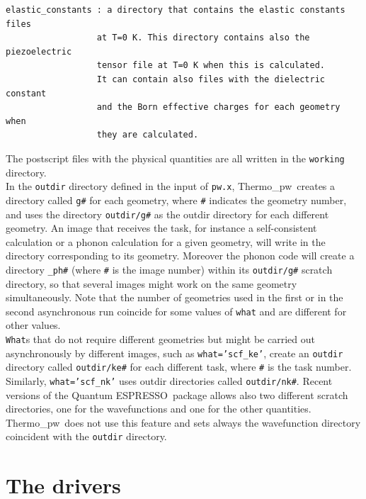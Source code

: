 \documentclass[12pt,a4paper,twoside]{report}
\def\qe{{\sc Quantum ESPRESSO}}
\def\tpw{{\sc Thermo}\_{\sc pw}}
\begin{document}
\begin{footnotesize}
\begin{verbatim}
elastic_constants : a directory that contains the elastic constants files
                  at T=0 K. This directory contains also the piezoelectric
                  tensor file at T=0 K when this is calculated.
                  It can contain also files with the dielectric constant
                  and the Born effective charges for each geometry when 
                  they are calculated.
\end{verbatim}
\end{footnotesize}
The postscript files with the physical quantities are all written in
the \texttt{working} directory. \\
In the \texttt{outdir} directory defined in the input of \texttt{pw.x},
\tpw\ creates a directory called \texttt{g\#} for each geometry, 
where \texttt{\#} indicates the geometry number, and uses the directory 
\texttt{outdir/g\#} as the outdir directory for each different geometry. 
An image that receives the task, for instance a self-consistent calculation 
or a phonon calculation for a given geometry, will write in the directory 
corresponding to its geometry.
Moreover the phonon code will create a directory \texttt{\_ph\#} 
(where \texttt{\#} is the image number) within its \texttt{outdir/g\#} scratch 
directory, so that several images might work on the same geometry 
simultaneously.
Note that the number of geometries used in the first or in the second
asynchronous run coincide for some values of \texttt{what} and are
different for other values. \\
\texttt{What}s that do not require different geometries but might be carried
out asynchronously by different images, such as \texttt{what='scf\_ke'}, 
create an \texttt{outdir} directory called
\texttt{outdir/ke\#} for each different task, where \texttt{\#} is the
task number. Similarly, \texttt{what='scf\_nk'} uses outdir directories
called \texttt{outdir/nk\#}.
Recent versions of the \qe\ package allows also two different scratch
directories, one for the wavefunctions and one for the other quantities.
\tpw\ does not use this feature and sets always the wavefunction
directory coincident with the \texttt{outdir} directory.

\newpage
{\color{dark-blue}\chapter{The drivers}}
\color{black}
\end{document}
